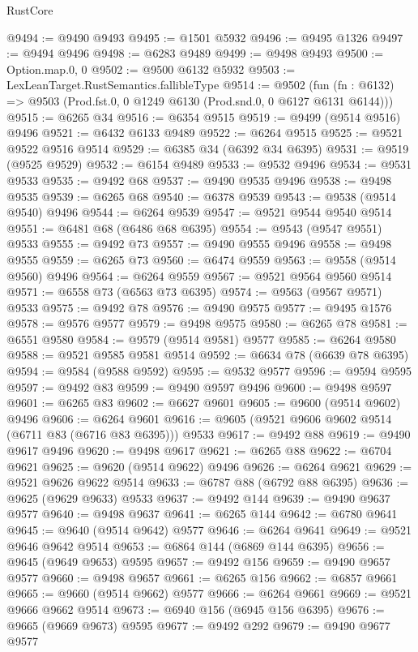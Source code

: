 \begin{lexlean}{RustCore}
\begin{coremodule}
@9494 := @9490 @9493
@9495 := @1501 @5932
@9496 := @9495 @1326
@9497 := @9494 @9496
@9498 := @6283 @9489
@9499 := @9498 @9493
@9500 := Option.map.{0, 0}
@9502 := @9500 @6132 @5932
@9503 := LexLeanTarget.RustSemantics.fallibleType
@9514 := @9502
    (fun (fn : @6132) => @9503 (Prod.fst.{0, 0} @1249 @6130 (Prod.snd.{0, 0} @6127 @6131 @6144)))
@9515 := @6265 @34
@9516 := @6354 @9515
@9519 := @9499 (@9514 @9516) @9496
@9521 := @6432 @6133 @9489
@9522 := @6264 @9515
@9525 := @9521 @9522 @9516 @9514
@9529 := @6385 @34 (@6392 @34 @6395)
@9531 := @9519 (@9525 @9529)
@9532 := @6154 @9489
@9533 := @9532 @9496
@9534 := @9531 @9533
@9535 := @9492 @68
@9537 := @9490 @9535 @9496
@9538 := @9498 @9535
@9539 := @6265 @68
@9540 := @6378 @9539
@9543 := @9538 (@9514 @9540) @9496
@9544 := @6264 @9539
@9547 := @9521 @9544 @9540 @9514
@9551 := @6481 @68 (@6486 @68 @6395)
@9554 := @9543 (@9547 @9551) @9533
@9555 := @9492 @73
@9557 := @9490 @9555 @9496
@9558 := @9498 @9555
@9559 := @6265 @73
@9560 := @6474 @9559
@9563 := @9558 (@9514 @9560) @9496
@9564 := @6264 @9559
@9567 := @9521 @9564 @9560 @9514
@9571 := @6558 @73 (@6563 @73 @6395)
@9574 := @9563 (@9567 @9571) @9533
@9575 := @9492 @78
@9576 := @9490 @9575
@9577 := @9495 @1576
@9578 := @9576 @9577
@9579 := @9498 @9575
@9580 := @6265 @78
@9581 := @6551 @9580
@9584 := @9579 (@9514 @9581) @9577
@9585 := @6264 @9580
@9588 := @9521 @9585 @9581 @9514
@9592 := @6634 @78 (@6639 @78 @6395)
@9594 := @9584 (@9588 @9592)
@9595 := @9532 @9577
@9596 := @9594 @9595
@9597 := @9492 @83
@9599 := @9490 @9597 @9496
@9600 := @9498 @9597
@9601 := @6265 @83
@9602 := @6627 @9601
@9605 := @9600 (@9514 @9602) @9496
@9606 := @6264 @9601
@9616 := @9605 (@9521 @9606 @9602 @9514 (@6711 @83 (@6716 @83 @6395))) @9533
@9617 := @9492 @88
@9619 := @9490 @9617 @9496
@9620 := @9498 @9617
@9621 := @6265 @88
@9622 := @6704 @9621
@9625 := @9620 (@9514 @9622) @9496
@9626 := @6264 @9621
@9629 := @9521 @9626 @9622 @9514
@9633 := @6787 @88 (@6792 @88 @6395)
@9636 := @9625 (@9629 @9633) @9533
@9637 := @9492 @144
@9639 := @9490 @9637 @9577
@9640 := @9498 @9637
@9641 := @6265 @144
@9642 := @6780 @9641
@9645 := @9640 (@9514 @9642) @9577
@9646 := @6264 @9641
@9649 := @9521 @9646 @9642 @9514
@9653 := @6864 @144 (@6869 @144 @6395)
@9656 := @9645 (@9649 @9653) @9595
@9657 := @9492 @156
@9659 := @9490 @9657 @9577
@9660 := @9498 @9657
@9661 := @6265 @156
@9662 := @6857 @9661
@9665 := @9660 (@9514 @9662) @9577
@9666 := @6264 @9661
@9669 := @9521 @9666 @9662 @9514
@9673 := @6940 @156 (@6945 @156 @6395)
@9676 := @9665 (@9669 @9673) @9595
@9677 := @9492 @292
@9679 := @9490 @9677 @9577

\end{coremodule}
\end{lexlean}

